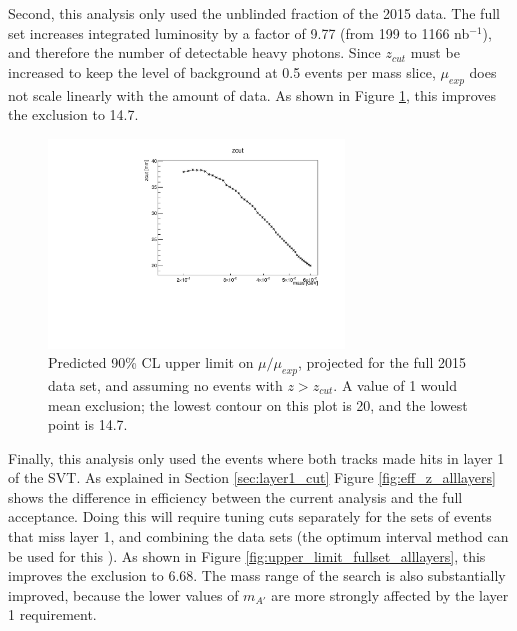 Second, this analysis only used the unblinded fraction of the 2015 data.
The full set increases integrated luminosity by a factor of 9.77 (from 199 to 1166 nb$^{-1}$), and therefore the number of detectable heavy photons.
Since $z_{cut}$ must be increased to keep the level of background at 0.5 events per mass slice, $\mu_{exp}$ does not scale linearly with the amount of data.
As shown in Figure \ref{fig:upper_limit_fullset}, this improves the exclusion to 14.7.

\begin{figure}[ht]
\begin{center}
    \includegraphics[width=0.7\textwidth,page=15,angle=-90]{vertexing/figs/golden_fullset_mres_nosignal_output}
\end{center}
\caption{Predicted 90\% CL upper limit on $\mu/\mu_{exp}$, projected for the full 2015 data set, and assuming no events with $z>z_{cut}$. A value of 1 would mean exclusion; the lowest contour on this plot is 20, and the lowest point is 14.7.}
    \label{fig:upper_limit_fullset}
\end{figure}

Finally, this analysis only used the events where both tracks made hits in layer 1 of the SVT.
As explained in Section \ref{sec:layer1_cut}
Figure \ref{fig:eff_z_alllayers} shows the difference in efficiency between the current analysis and the full acceptance.
Doing this will require tuning cuts separately for the sets of events that miss layer 1, and combining the data sets (the optimum interval method can be used for this \cite{yellin_ways_2011}).
As shown in Figure \ref{fig:upper_limit_fullset_alllayers}, this improves the exclusion to 6.68.
The mass range of the search is also substantially improved, because the lower values of $m_{A'}$ are more strongly affected by the layer 1 requirement.


